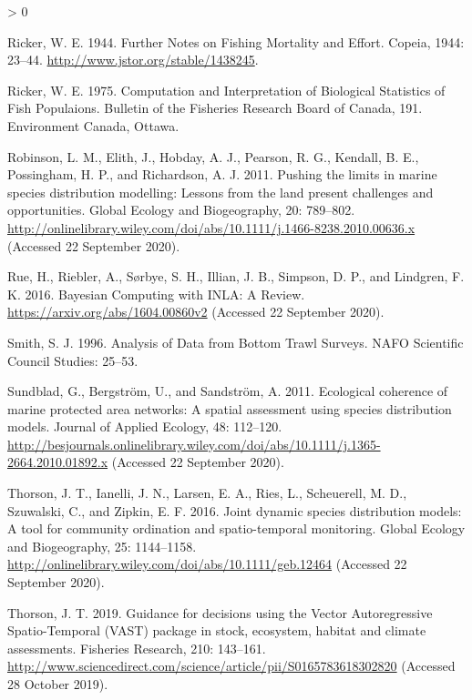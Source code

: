 \documentclass[
]{article}
\newlength{\cslhangindent}
\newenvironment{CSLReferences}[2] %
 {%
  \setlength{\parindent}{0pt}
  \ifodd #1 \everypar{\setlength{\hangindent}{\cslhangindent}}\ignorespaces\fi
  \ifnum #2 > 0
  \setlength{\parskip}{#2\baselineskip}
  \fi
 }%
 {}
\begin{document}
\begin{CSLReferences}{1}{0}
\leavevmode\hypertarget{ref-rickerFurtherNotesFishing1944}{}%
Ricker, W. E. 1944. Further {Notes} on {Fishing Mortality} and {Effort}. Copeia, 1944: 23--44. \url{http://www.jstor.org/stable/1438245}.

\leavevmode\hypertarget{ref-rickerComputationInterpretationBiological1975}{}%
Ricker, W. E. 1975. Computation and {Interpretation} of {Biological Statistics} of {Fish Populaions}. Bulletin of the {Fisheries Research Board} of {Canada}, 191. {Environment Canada}, {Ottawa}.

\leavevmode\hypertarget{ref-robinsonPushingLimitsMarine2011}{}%
Robinson, L. M., Elith, J., Hobday, A. J., Pearson, R. G., Kendall, B. E., Possingham, H. P., and Richardson, A. J. 2011. Pushing the limits in marine species distribution modelling: Lessons from the land present challenges and opportunities. Global Ecology and Biogeography, 20: 789--802. \url{http://onlinelibrary.wiley.com/doi/abs/10.1111/j.1466-8238.2010.00636.x} (Accessed 22 September 2020).

\leavevmode\hypertarget{ref-rueBayesianComputingINLA2016}{}%
Rue, H., Riebler, A., Sørbye, S. H., Illian, J. B., Simpson, D. P., and Lindgren, F. K. 2016. Bayesian {Computing} with {INLA}: {A Review}. \url{https://arxiv.org/abs/1604.00860v2} (Accessed 22 September 2020).

\leavevmode\hypertarget{ref-smithAnalysisDataBottom1996}{}%
Smith, S. J. 1996. Analysis of {Data} from {Bottom Trawl Surveys}. NAFO Scientific Council Studies: 25--53.

\leavevmode\hypertarget{ref-sundbladEcologicalCoherenceMarine2011}{}%
Sundblad, G., Bergström, U., and Sandström, A. 2011. Ecological coherence of marine protected area networks: A spatial assessment using species distribution models. Journal of Applied Ecology, 48: 112--120. \url{http://besjournals.onlinelibrary.wiley.com/doi/abs/10.1111/j.1365-2664.2010.01892.x} (Accessed 22 September 2020).

\leavevmode\hypertarget{ref-thorsonJointDynamicSpecies2016}{}%
Thorson, J. T., Ianelli, J. N., Larsen, E. A., Ries, L., Scheuerell, M. D., Szuwalski, C., and Zipkin, E. F. 2016. Joint dynamic species distribution models: A tool for community ordination and spatio-temporal monitoring. Global Ecology and Biogeography, 25: 1144--1158. \url{http://onlinelibrary.wiley.com/doi/abs/10.1111/geb.12464} (Accessed 22 September 2020).

\leavevmode\hypertarget{ref-thorsonGuidanceDecisionsUsing2019}{}%
Thorson, J. T. 2019. Guidance for decisions using the {Vector Autoregressive Spatio}-{Temporal} ({VAST}) package in stock, ecosystem, habitat and climate assessments. Fisheries Research, 210: 143--161. \url{http://www.sciencedirect.com/science/article/pii/S0165783618302820} (Accessed 28 October 2019).


\end{CSLReferences}
\end{document}
